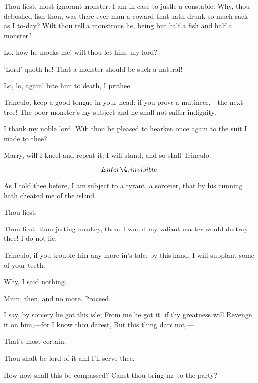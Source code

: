 \documentclass[11pt]{book}
\begin{document}
\begin{PROSE}

	Thou liest, most ignorant monster: I am in case to
	justle a constable. Why, thou deboshed fish thou,
	was there ever man a coward that hath drunk so much
	sack as I to-day? Wilt thou tell a monstrous lie,
	being but half a fish and half a monster?

\5	Lo, how he mocks me! wilt thou let him, my lord?

	'Lord' quoth he! That a monster should be such a natural!

\5	Lo, lo, again! bite him to death, I prithee.

	Trinculo, keep a good tongue in your head: if you
	prove a mutineer,---the next tree! The poor monster's
	my subject and he shall not suffer indignity.

\5	I thank my noble lord. Wilt thou be pleased to
	hearken once again to the suit I made to thee?

	Marry, will I	kneel and repeat it; I will stand,
	and so shall Trinculo.

	\[Enter \4, invisible\]

\5	As I told thee before, I am subject to a tyrant, a
	sorcerer, that by his cunning hath cheated me of the island.

\4	Thou liest.

\end{PROSE}

\5	Thou liest, thou jesting monkey, thou.
   I would my valiant master would destroy thee!
   I do not lie.

\begin{PROSE}

	Trinculo, if you trouble him any more in's tale, by
	this hand, I will supplant some of your teeth.

	Why, I said nothing.

	Mum, then, and no more. Proceed.

\end{PROSE}

\5	I say, by sorcery he got this isle;
	From me he got it. if thy greatness will
	Revenge it on him,---for I know thou darest,
	But this thing dare not,---

\begin{PROSE}

	That's most certain.

\5	Thou shalt be lord of it and I'll serve thee.

	How now shall this be compassed?
	Canst thou bring me to the party?

\end{PROSE}
\end{document}
